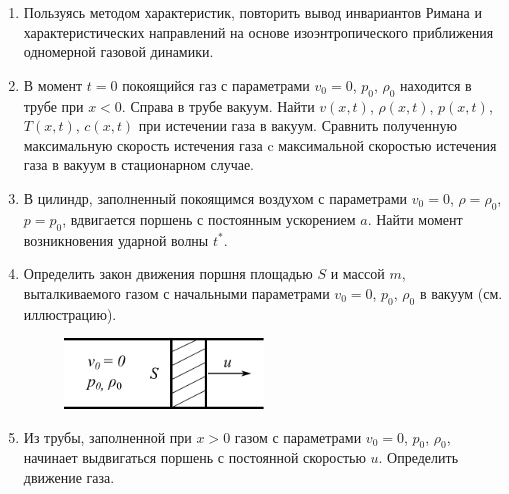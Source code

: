 \documentclass[a4paper, 14pt]{extarticle}
\begin{document}
\begin{enumerate}
	
	\item Пользуясь методом характеристик, повторить вывод инвариантов Римана и характеристических направлений на основе изоэнтропического приближения одномерной газовой динамики.
	
	\item
	В момент $t=0$  покоящийся газ с параметрами $v_0 = 0$, $p_0$, $\rho_0$ находится в трубе при $x<0$. Справа в трубе вакуум. Найти $v(x,t)$, $\rho(x,t)$, $p(x,t)$, $T(x,t)$, $c(x,t)$ при истечении газа в вакуум. Сравнить полученную максимальную скорость истечения газа c максимальной скоростью истечения газа в вакуум в стационарном случае.
	
	\item 
	В цилиндр, заполненный покоящимся воздухом с параметрами $v_0 = 0$, $\rho=\rho_0$, $p=p_0$, вдвигается поршень с постоянным ускорением $a$. Найти момент возникновения ударной волны $t^*$.
	
	\item
	Определить закон движения поршня площадью $S$ и массой $m$, выталкиваемого газом с начальными параметрами $v_0=0$, $p_0$, $\rho_0$ в вакуум (см. иллюстрацию).

	\begin{figure}[h!]
		\centering
		\includegraphics[width=0.5\textwidth]{../img/piston_u.pdf}
	\end{figure}
	
	\item 
	Из трубы, заполненной при $x>0$ газом с параметрами  $v_0=0$, $p_0$, $\rho_0$, начинает выдвигаться поршень с постоянной скоростью $u$. Определить движение газа.

\end{enumerate}
\end{document}
